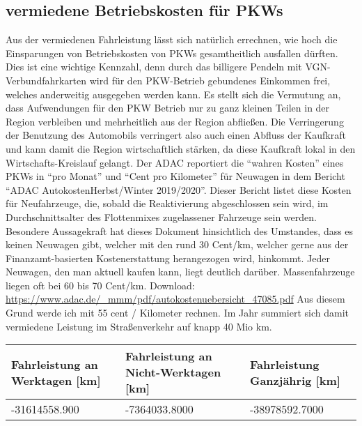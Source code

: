 \documentclass[fontsize=12pt,a4paper]{scrreprt}
\begin{document}
\subsection{vermiedene Betriebskosten für PKWs}
Aus der vermiedenen Fahrleistung lässt sich natürlich errechnen, wie hoch die Einsparungen von Betriebskosten von PKWs gesamtheitlich ausfallen dürften. Dies ist eine wichtige Kennzahl, denn durch das billigere Pendeln mit VGN-Verbundfahrkarten wird für den PKW-Betrieb gebundenes Einkommen frei, welches anderweitig ausgegeben werden kann. Es stellt sich die Vermutung an, dass Aufwendungen für den PKW Betrieb nur zu ganz kleinen Teilen in der Region verbleiben und mehrheitlich aus der Region abfließen. Die Verringerung der Benutzung des Automobils verringert also auch einen Abfluss der Kaufkraft und kann damit die Region wirtschaftlich stärken, da diese Kaufkraft lokal in den Wirtschafts-Kreislauf gelangt.
\newline
\newline
Der ADAC reportiert die \enquote{wahren Kosten} eines PKWs in \enquote{pro Monat} und \enquote{Cent pro Kilometer} für Neuwagen in dem Bericht \enquote{ADAC AutokostenHerbst/Winter 2019/2020}. Dieser Bericht listet diese Kosten für Neufahrzeuge, die, sobald die Reaktivierung abgeschlossen sein wird, im Durchschnittsalter des Flottenmixes zugelassener Fahrzeuge sein werden.\newline
Besondere Aussagekraft hat dieses Dokument hinsichtlich des Umstandes, dass es keinen Neuwagen gibt, welcher mit den rund 30 Cent/km, welcher gerne aus der Finanzamt-basierten Kostenerstattung herangezogen wird, hinkommt. Jeder Neuwagen, den man aktuell kaufen kann, liegt deutlich darüber. Massenfahrzeuge liegen oft bei 60 bis 70 Cent/km.\newline
Download: \url{https://www.adac.de/_mmm/pdf/autokostenuebersicht_47085.pdf}\newline
\newline
Aus diesem Grund werde ich mit 55 cent / Kilometer rechnen.\newline
\newline
Im Jahr summiert sich damit vermiedene Leistung im Straßenverkehr auf knapp 40 Mio km.
\newline
\newline
\begin{tabular}{| l | l | l |}
        \hline
        Fahrleistung an Werktagen [km] & Fahrleistung an Nicht-Werktagen [km] & Fahrleistung Ganzjährig [km]\\ 
        \hline
        -31614558.900 & -7364033.8000 & -38978592.7000\\ 
        \hline
\end{tabular}
\end{document}
